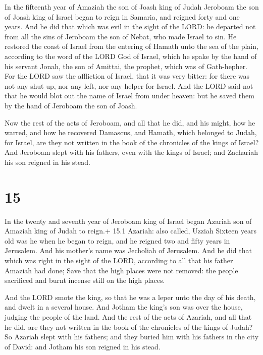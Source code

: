  In the fifteenth year of Amaziah the son of Joash king
of Judah Jeroboam the son of Joash king of Israel began to reign in
Samaria, and reigned forty and one years.  And he did that
which was evil in the sight of the LORD: he departed not from all the
sins of Jeroboam the son of Nebat, who made Israel to sin. 
He restored the coast of Israel from the entering of Hamath unto the sea
of the plain, according to the word of the LORD God of Israel, which he
spake by the hand of his servant Jonah, the son of Amittai, the prophet,
which was of Gath-hepher.  For the LORD saw the affliction
of Israel, that it was very bitter: for there was not any shut up, nor
any left, nor any helper for Israel.  And the LORD said not
that he would blot out the name of Israel from under heaven: but he
saved them by the hand of Jeroboam the son of Joash.

 Now the rest of the acts of Jeroboam, and all that he
did, and his might, how he warred, and how he recovered Damascus, and
Hamath, which belonged to Judah, for Israel, are they not written in the
book of the chronicles of the kings of Israel?  And
Jeroboam slept with his fathers, even with the kings of Israel; and
Zachariah his son reigned in his stead.

\hypertarget{section-14}{%
\section{15}\label{section-14}}

 In the twenty and seventh year of Jeroboam king of Israel
began Azariah son of Amaziah king of Judah to reign.+ 15.1 Azariah: also
called, Uzziah  Sixteen years old was he when he began to
reign, and he reigned two and fifty years in Jerusalem. And his mother's
name was Jecholiah of Jerusalem.  And he did that which was
right in the sight of the LORD, according to all that his father Amaziah
had done;  Save that the high places were not removed: the
people sacrificed and burnt incense still on the high places.

 And the LORD smote the king, so that he was a leper unto
the day of his death, and dwelt in a several house. And Jotham the
king's son was over the house, judging the people of the land.
 And the rest of the acts of Azariah, and all that he did,
are they not written in the book of the chronicles of the kings of
Judah?  So Azariah slept with his fathers; and they buried
him with his fathers in the city of David: and Jotham his son reigned in
his stead.

